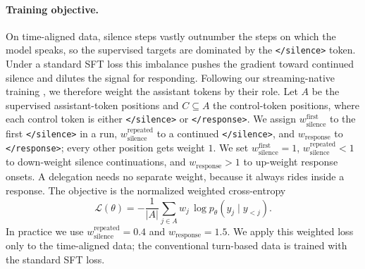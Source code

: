 \paragraph{\textbf{Training objective.}}
On time-aligned data, silence steps vastly outnumber the steps on which the model speaks, so the supervised targets are dominated by the \texttt{</silence>} token. Under a standard SFT loss this imbalance pushes the gradient toward continued silence and dilutes the signal for responding. Following our streaming-native training \cite{yao2026harnessingstreamingvideowild}, we therefore weight the assistant tokens by their role. Let $A$ be the supervised assistant-token positions and $C \subseteq A$ the control-token positions, where each control token is either \texttt{</silence>} or \texttt{</response>}. We assign $w^{\text{first}}_{\text{silence}}$ to the first \texttt{</silence>} in a run, $w^{\text{repeated}}_{\text{silence}}$ to a continued \texttt{</silence>}, and $w_{\text{response}}$ to \texttt{</response>}; every other position gets weight $1$. We set $w^{\text{first}}_{\text{silence}}=1$, $w^{\text{repeated}}_{\text{silence}}<1$ to down-weight silence continuations, and $w_{\text{response}}>1$ to up-weight response onsets. A delegation needs no separate weight, because it always rides inside a response. The objective is the normalized weighted cross-entropy
\begin{equation}
\mathcal{L}(\theta) = -\frac{1}{|A|} \sum_{j \in A} w_j \, \log p_\theta(y_j \mid y_{<j}).
\end{equation}
In practice we use $w^{\text{repeated}}_{\text{silence}}=0.4$ and $w_{\text{response}}=1.5$. We apply this weighted loss only to the time-aligned data; the conventional turn-based data is trained with the standard SFT loss.

